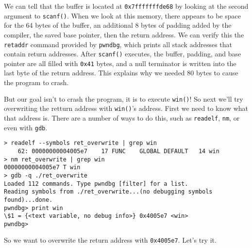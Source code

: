 \documentclass{article}
\begin{document}
We can tell that the buffer is located at \texttt{0x7fffffffde68} by looking at
the second argument to \texttt{scanf()}. When we look at this memory, there
appears to be space for the 64 bytes of the buffer, an additional 8 bytes of
padding added by the compiler, the saved base pointer, then the return address.
We can verify this the \texttt{retaddr} command provided by \texttt{pwndbg},
which prints all stack addresses that contain return addresses. After
\texttt{scanf()} executes, the buffer, padding, and base pointer are all filled
with \texttt{0x41} bytes, and a null terminator is written into the last byte of
the return address. This explains why we needed 80 bytes to cause the program to
crash.

But our goal isn't to crash the program, it is to execute \texttt{win()}! So next
we'll try overwriting the retturn address with \texttt{win()}'s address. First
we need to know what that address is. There are a number of ways to do this,
such as \texttt{readelf}, \texttt{nm}, or even with \texttt{gdb}.

\begin{lstlisting}
> readelf --symbols ret_overwrite | grep win
    62: 00000000004005e7    17 FUNC    GLOBAL DEFAULT   14 win
> nm ret_overwrite | grep win
00000000004005e7 T win
> gdb -q ./ret_overwrite
Loaded 112 commands. Type pwndbg [filter] for a list.
Reading symbols from ./ret_overwrite...(no debugging symbols found)...done.
pwndbg> print win
\$1 = {<text variable, no debug info>} 0x4005e7 <win>
pwndbg> 
\end{lstlisting}

So we want to overwrite the return address with \texttt{0x4005e7}. Let's try it.
\end{document}
